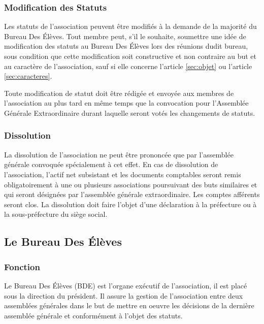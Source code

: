 \documentclass{article} %
\begin{document}
			\subsubsection{Modification des Statuts}
				Les statuts de l’association peuvent être modifiés à la demande de la
				majorité du Bureau Des Élèves. Tout membre peut, s’il le souhaite,
				soumettre une idée de modification des statuts au Bureau Des Élèves
				lors des réunions dudit bureau, sous condition que cette modification
				soit constructive et non contraire au but et au caractère de
				l’association, sauf si elle concerne l'article
				\ref{sec:objet} ou l'article \ref{sec:caracteres}.

				Toute modification de statut doit être rédigée et envoyée aux membres
				de l’association au plus tard en même temps que la convocation pour
				l’Assemblée Générale Extraordinaire durant laquelle seront votés les
				changements de statuts.

			\subsubsection{Dissolution}
				La dissolution de l’association ne peut être prononcée que par
				l’assemblée générale convoquée spécialement à cet effet.
				En cas de dissolution de l’association, l’actif net subsistant et les
				documents comptables seront remis obligatoirement à une ou plusieurs
				associations poursuivant des buts similaires et qui seront désignées
				par l’assemblée générale extraordinaire. Les comptes afférents seront
				clos.
				La dissolution doit faire l’objet d’une déclaration à la préfecture
				ou à la sous-préfecture du siège social.

		\subsection{Le Bureau Des Élèves}
			\subsubsection{Fonction}
				Le Bureau Des Élèves (BDE) est l'organe exécutif de l'association, il
				est placé sous la direction du président. Il assure la gestion de
				l'association entre deux assemblées générales dans le but de mettre
				en oeuvre les décisions de la dernière assemblée générale et
				conformément à l'objet des statuts.
\end{document}
